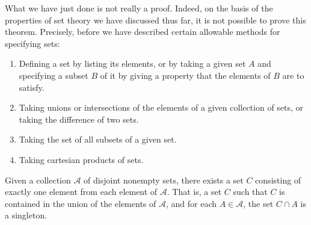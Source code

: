     \begin{remark}
        What we have just done is not really a proof. Indeed, on the basis of the properties of set theory we have discussed thus far, it is not possible to prove this theorem. Precisely, before we have described certain allowable methods for specifying sets:\begin{enumerate}
            \item Defining a set by listing its elements, or by taking a given set $A$ and specifying a subset $B$ of it by giving a property that the elements of $B$ are to satisfy.
            \item Taking unions or intersections of the elements of a given collection of sets, or taking the difference of two sets.
            \item Taking the set of all subsets of a given set.
            \item Taking cartesian products of sets.
        \end{enumerate}
    \end{remark}

    \begin{axiom}
        Given a collection $\mathscr{A}$ of disjoint nonempty sets, there exists a set $C$ consisting of exactly one element from each element of $\mathscr{A}$. That is, a set $C$ such that $C$ is contained in the union of the elements of $\mathscr{A}$, and for each $A \in \mathscr{A}$, the set $C\cap A$ is a singleton.
    \end{axiom}

